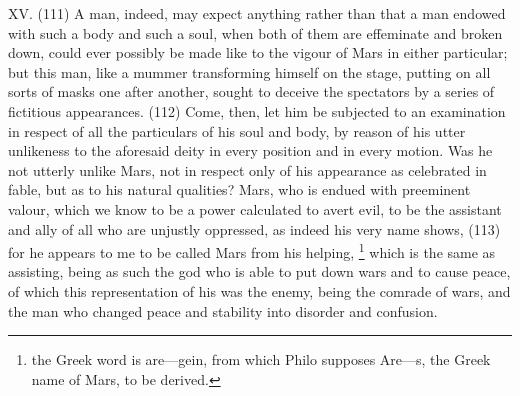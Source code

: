 XV. (111) A man, indeed, may expect anything rather than that a man endowed with such a body
and such a soul, when both of them are effeminate and broken down, could ever possibly be made
like to the vigour of Mars in either particular; but this man, like a mummer transforming himself on
the stage, putting on all sorts of masks one after another, sought to deceive the spectators by a
series of fictitious appearances. (112) Come, then, let him be subjected to an examination in
respect of all the particulars of his soul and body, by reason of his utter unlikeness to the aforesaid
deity in every position and in every motion. Was he not utterly unlike Mars, not in respect only of
his appearance as celebrated in fable, but as to his natural qualities? Mars, who is endued with
preeminent valour, which we know to be a power calculated to avert evil, to be the assistant and
ally of all who are unjustly oppressed, as indeed his very name shows, (113) for he appears to me
to be called Mars from his helping, \footnote{the Greek word is are—gein, from which Philo supposes Are—s, the Greek
name of Mars, to be derived.} which is the same as assisting, being as such the god who is able to put
down wars and to cause peace, of which this representation of his was the enemy, being the
comrade of wars, and the man who changed peace and stability into disorder and confusion.

